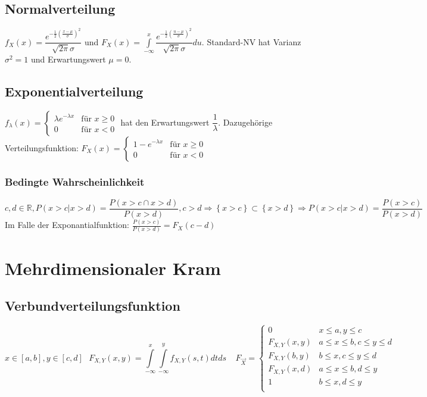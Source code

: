 \documentclass[10pt,a4paper]{article}
\begin{document}
\subsection{Normalverteilung}
$f_X(x)=\dfrac{e^{-\frac{1}{2} \left( \frac{x- \mu}{\sigma} \right)^2}}{\sqrt{2 \pi} \sigma}$ und
$F_X(x)=\int\limits_{-\infty}^x \dfrac{e^{-\frac{1}{2} \left( \frac{u- \mu}{\sigma} \right)^2}}{\sqrt{2 \pi} \sigma} du$. Standard-NV hat Varianz $\sigma^2 = 1$ und Erwartungswert $\mu = 0$.

\subsection{Exponentialverteilung}
$f_\lambda(x) =
\begin{cases}
\lambda e^{-\lambda x} & \mbox{für } x \geq 0 \\
0 & \mbox{für } x < 0
\end{cases}
$ hat den Erwartungswert $\dfrac{1}{\lambda}$. Dazugehörige Verteilungsfunktion: $F_X(x) = \begin{cases}
1-e^{-\lambda x} & \mbox{für } x \geq 0 \\
0 & \mbox{für } x < 0
\end{cases}$

\subsubsection{Bedingte Wahrscheinlichkeit}
\[c, d \in \mathbb{R},
P(x > c | x > d) = \dfrac{P(x>c \cap x > d)}{P(x > d)}, c>d \Rightarrow \left\{ x > c \right\} \subset
\left\{ x > d \right\} \Rightarrow P(x > c | x > d) = \dfrac{P(x>c)}{P(x > d)}\]
Im Falle der Exponantialfunktion: $\frac{P(x>c)}{P(x > d)} = F_X(c-d)$

\section{Mehrdimensionaler Kram}
\subsection{Verbundverteilungsfunktion}
\[x \in \left[a,b\right], y \in \left[c,d\right]\ \ \ 
F_{X,Y}(x,y) = \int\limits_{-\infty}^x
\int\limits_{-\infty}^y f_{X,Y}(s,t) dt ds \ \ \ \ \ F_{\vec{X}} =
\begin{cases}
0 & x \leq a, y\leq c \\
F_{X,Y}(x,y) & a \leq x \leq b, c\leq y\leq d \\
F_{X,Y}(b,y) & b \leq x, c\leq y\leq d \\
F_{X,Y}(x,d) & a \leq x \leq b, d\leq y \\
1 & b \leq x, d\leq y \\
\end{cases}
\]
\end{document}
